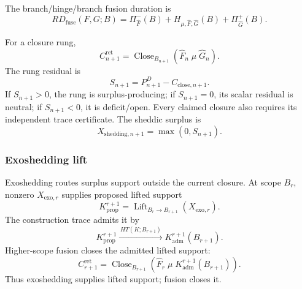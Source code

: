 The branch/hinge/branch fusion duration is
\begin{equation}
RD_{\mathrm{fuse}}(F,G;B)
=
\Pi^-_{\widehat F}(B)+H_{\mu,\widehat F,\widehat G}(B)+\Pi^+_{\widehat G}(B).
\label{eq:fusion-branch-hinge-duration}
\end{equation}

For a closure rung,
\begin{equation}
C^{\mathrm{ret}}_{n+1}
=
\operatorname{Close}_{B_{n+1}}
\left(
\widehat F_n\;\mu\;\widehat G_n
\right).
\label{eq:fusion-ladder-rung}
\end{equation}
The rung residual is
\begin{equation}
S_{n+1}=P^D_{n+1}-C_{\mathrm{close},n+1}.
\label{eq:fusion-rung-residual}
\end{equation}
If \(S_{n+1}>0\), the rung is surplus-producing; if \(S_{n+1}=0\), its scalar residual is neutral; if \(S_{n+1}<0\), it is deficit/open. Every claimed closure also requires its independent trace certificate. The sheddic surplus is
\begin{equation}
X_{\mathrm{shedding},n+1}=\max(0,S_{n+1}).
\label{eq:fusion-rung-shedding-surplus}
\end{equation}

\subsubsection{Exoshedding lift}\label{subsec:exoshedding-lift}
Exoshedding routes surplus support outside the current closure. At scope \(B_r\), nonzero \(X_{\mathrm{exo},r}\) supplies proposed lifted support
\begin{equation}
K^{r+1}_{\mathrm{prop}}
=
\operatorname{Lift}_{B_r\to B_{r+1}}
\left(X_{\mathrm{exo},r}\right).
\label{eq:exoshedding-lift}
\end{equation}
The construction trace admits it by
\begin{equation}
K^{r+1}_{\mathrm{prop}}
\xrightarrow{\,HT(K;B_{r+1})\,}
K^{r+1}_{\mathrm{adm}}(B_{r+1}).
\label{eq:lifted-support-admission}
\end{equation}
Higher-scope fusion closes the admitted lifted support:
\begin{equation}
C^{\mathrm{ret}}_{r+1}
=
\operatorname{Close}_{B_{r+1}}
\left(
\widehat F_r\;\mu\;K^{r+1}_{\mathrm{adm}}(B_{r+1})
\right).
\label{eq:higher-scope-fusion}
\end{equation}
Thus exoshedding supplies lifted support; fusion closes it.

